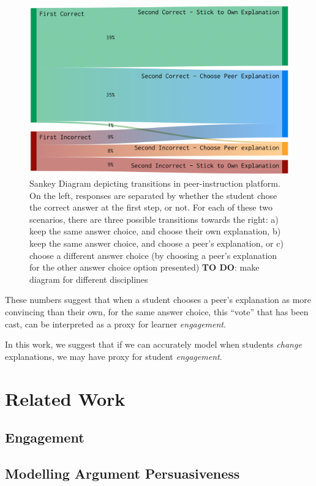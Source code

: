 \documentclass[sigconf]{acmart}
\begin{document}
\begin{figure}
	\includegraphics[width=\linewidth]{img/transitions_final}
	\caption{
		Sankey Diagram depicting transitions in peer-instruction 
		platform.
		On the left, responses are separated by whether the student chose the 
		correct answer at the first step, or not.
		For each of these two scenarios, there are three possible transitions 
		towards the right: a) keep the same answer choice, and choose their own 
		explanation, b) keep the same answer choice, and choose a peer's 
		explanation, or c) choose a different answer choice (by choosing a 
		peer's explanation for the other answer choice option presented)
		\textbf{TO DO}: make diagram for different 
		disciplines
	}
	\label{fig:sankey}
\end{figure}

These numbers suggest that when a student chooses a peer's explanation as more 
convincing than their own, for the same answer choice, this ``vote'' that has 
been cast, can be interpreted as a proxy for learner \textit{engagement}.

In this work, we suggest that if we can accurately model when students 
\textit{change} explanations, we may have proxy for student 
\textit{engagement}. 


\section{Related Work}

\subsection{Engagement}


\subsection{Modelling Argument Persuasiveness}
\end{document}
